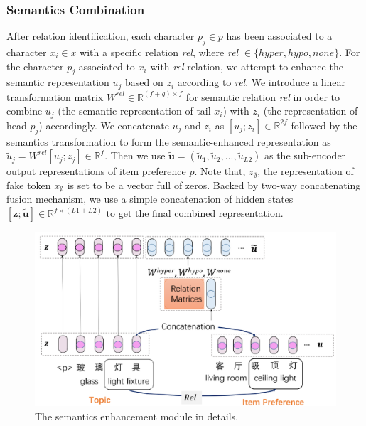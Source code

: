 \subsubsection{Semantics Combination}
\label{sec:combination}
After relation identification, 
each character $p_j \in p$ has been associated to 
a character $x_i \in x$ with a specific relation \emph{rel},
where \emph{rel} $\in \{ hyper, hypo, none\}$.
For the character $p_j$ associated to $x_i$ with \emph{rel} relation,
we attempt to enhance the semantic representation $u_j$ 
based on $z_i$ according to \emph{rel}.
We introduce a linear transformation matrix $W^{rel} \in \mathbb{ R }^{(f+g) \times f}$ for semantic relation \emph{rel}
in order to combine  $u_j$ (the semantic representation of tail $x_i$) with 
$z_i$ (the representation of head $p_j$) accordingly.
We concatenate $u_j$ and $z_i$ as $[u_j; z_i] \in \mathbb{ R }^{2f}$ followed by 
the semantics transformation 
to form the semantic-enhanced representation
as $\tilde{u}_j = W^{rel}[u_j ; z_j] \in \mathbb{ R }^{f}$.
Then we use $\tilde{\textbf{u}} = (\tilde{u}_1, \tilde{u}_2, ..., \tilde{u}_{L2})$
as the sub-encoder output representations of item preference $p$.
Note that, $z_{\emptyset}$, the representation of fake token $x_{\emptyset}$ is set to be a vector full of zeros.
Backed by two-way concatenating fusion mechanism, 
we use a simple concatenation of hidden states $[\textbf{z}; \tilde{\textbf{u}}] \in \mathbb{ R }^{f\times (L1+L2)}$ to get the final combined representation.





\begin{figure}[th!]
	\centering
	\includegraphics[width=1.0\columnwidth]{figures/enhancement}
	\caption{The semantics enhancement module in details.}
	\label{fig:enhancement}
\end{figure}


